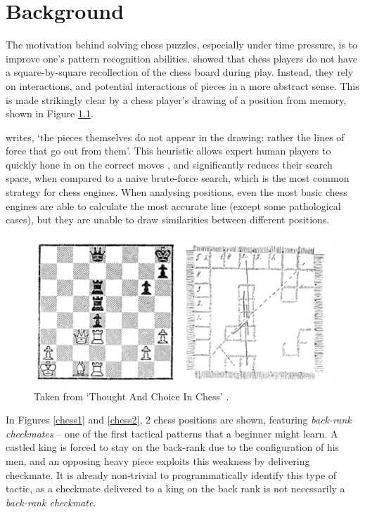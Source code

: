 \chapter{Background}\label{backgroundChapter}

The motivation behind solving chess puzzles, especially under time pressure, is
to improve one's pattern recognition abilities. \citet{thoughtAndChoice} showed
that chess players do not have a square-by-square recollection of the chess
board during play. Instead, they rely on interactions, and potential
interactions of pieces in a more abstract sense. This is made strikingly clear
by a chess player's drawing of a position from memory, shown in Figure
\ref{deGrootFigure}.

\citet{thoughtAndChoice} writes, `the pieces themselves do not appear in the
drawing: rather the lines of force that go out from them'. This heuristic
allows expert human players to quickly hone in on the correct moves
\citep{bilalic2010mechanisms}, and significantly reduces their search space,
when compared to a naive brute-force search, which is the most common strategy
for chess engines. When analysing positions, even the most basic chess engines
are able to calculate the most accurate line (except some pathological cases),
but they are unable to draw similarities between different positions.

\begin{figure}[H]
    \centering
    \includegraphics[width=0.9\linewidth]{background/img/deGroot.png}
    \caption{Taken from `Thought And Choice In Chess'
    \citep{thoughtAndChoice}.}
    \label{deGrootFigure}
\end{figure}

In Figures \ref{chess1} and \ref{chess2}, 2 chess positions are shown,
featuring \emph{back-rank checkmates} -- one of the first tactical patterns
that a beginner might learn. A castled king is forced to stay on the back-rank
due to the configuration of his men, and an opposing heavy piece exploits this
weakness by delivering checkmate. It is already non-trivial to programmatically
identify this type of tactic, as a checkmate delivered to a king on the back
rank is not necessarily a \emph{back-rank checkmate}.

